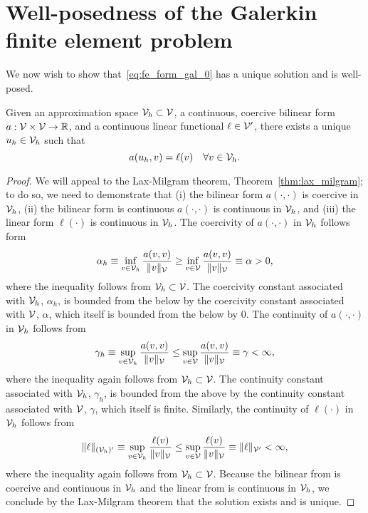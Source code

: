 \section{Well-posedness of the Galerkin finite element problem}
\label{sec:fe_form_gal_wellposed}
We now wish to show that~\eqref{eq:fe_form_gal_0} has a unique solution and is well-posed.
\begin{proposition}
  \label{prop:fe_form_gal_wellposed}
    Given an approximation space $\mathcal{V}_h \subset \mathcal{V}$, a continuous, coercive bilinear form $a: \mathcal{V} \times \mathcal{V} \to \mathbb{R}$, and a continuous linear functional $\ell \in \mathcal{V}'$, there exists a unique $u_h \in \mathcal{V}_h$ such that
  \begin{equation*}
    a(u_h,v) = \ell(v) \quad \forall v \in \mathcal{V}_h.
  \end{equation*}
  \begin{proof}
We will appeal to the Lax-Milgram theorem, Theorem~\ref{thm:lax_milgram}; to do so, we need to demonstrate that (i) the bilinear form $a(\cdot,\cdot)$ is coercive in $\mathcal{V}_h$, (ii) the bilinear form is continuous $a(\cdot,\cdot)$ is continuous in $\mathcal{V}_h$, and (iii) the linear form $\ell(\cdot)$ is continuous in $\mathcal{V}_h$.  The coercivity of $a(\cdot,\cdot)$ in $\mathcal{V}_h$ follows form
\begin{equation*}
  \alpha_h \equiv \inf_{v \in \mathcal{V}_h} \frac{a(v,v)}{\| v \|_{\mathcal{V}}} \geq
  \inf_{v \in \mathcal{V}} \frac{a(v,v)}{\| v \|_{\mathcal{V}}} \equiv \alpha > 0,
\end{equation*}
where the inequality follows from $\mathcal{V}_h \subset \mathcal{V}$.  The coercivity constant associated with $\mathcal{V}_h$, $\alpha_h$, is bounded from the below by the coercivity constant associated with $\mathcal{V}$, $\alpha$, which itself is bounded from the below by $0$. The continuity of $a(\cdot,\cdot)$ in $\mathcal{V}_h$ follows from
\begin{equation*}
  \gamma_h \equiv \sup_{v \in \mathcal{V}_h} \frac{a(v,v)}{\| v \|_{\mathcal{V}}} \leq
  \sup_{v \in \mathcal{V}} \frac{a(v,v)}{\| v \|_{\mathcal{V}}} \equiv \gamma < \infty,
\end{equation*}
where the inequality again follows from $\mathcal{V}_h \subset \mathcal{V}$.  The continuity constant associated with $\mathcal{V}_h$, $\gamma_h$, is bounded from the above by the continuity constant associated with $\mathcal{V}$, $\gamma$, which itself is finite.  Similarly, the continuity of $\ell(\cdot)$ in $\mathcal{V}_h$ follows from
\begin{equation*}
  \| \ell \|_{(\mathcal{V}_h)'} \equiv \sup_{v \in \mathcal{V}_h} \frac{\ell(v)}{\| v \|_{\mathcal{V}}} \leq \sup_{v \in \mathcal{V}} \frac{\ell(v)}{\| v \|_{\mathcal{V}}} \equiv \| \ell \|_{\mathcal{V}'} < \infty,
\end{equation*}
where the inequality again follows from $\mathcal{V}_h \subset \mathcal{V}$.  Because the bilinear from is coercive and continuous in $\mathcal{V}_h$ and the linear from is continuous in $\mathcal{V}_h$, we conclude by the Lax-Milgram theorem that the solution exists and is unique.
  \end{proof}
\end{proposition}
